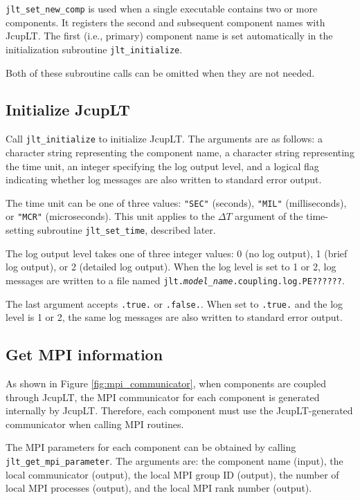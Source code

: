 \documentclass[11pt,a4paper]{report}
\newcommand{\figref}[1]{Figure \ref{#1}}
\begin{document}
\texttt{jlt\_set\_new\_comp} is used
when a single executable contains two or more components.
It registers the second and subsequent component names with JcupLT.
The first (i.e., primary) component name
is set automatically in the initialization subroutine
\texttt{jlt\_initialize}.

Both of these subroutine calls can be omitted
when they are not needed.

\subsection{Initialize JcupLT}

Call \texttt{jlt\_initialize} to initialize JcupLT.
The arguments are as follows:
a character string representing the component name,
a character string representing the time unit,
an integer specifying the log output level,
and a logical flag indicating whether log messages
are also written to standard error output.

The time unit can be one of three values:
\texttt{"SEC"} (seconds),
\texttt{"MIL"} (milliseconds),
or \texttt{"MCR"} (microseconds).
This unit applies to the $\Delta T$ argument
of the time-setting subroutine \texttt{jlt\_set\_time},
described later.

The log output level takes one of three integer values:
0 (no log output),
1 (brief log output),
or 2 (detailed log output).
When the log level is set to 1 or 2,
log messages are written to a file named
\texttt{jlt.\textit{model\_name}.coupling.log.PE??????}.

The last argument accepts \texttt{.true.} or \texttt{.false.}.
When set to \texttt{.true.}
and the log level is 1 or 2,
the same log messages are also written
to standard error output.

\subsection{Get MPI information}

As shown in \figref{fig:mpi_communicator},
when components are coupled through JcupLT,
the MPI communicator for each component
is generated internally by JcupLT.
Therefore, each component must use
the JcupLT-generated communicator
when calling MPI routines.

The MPI parameters for each component
can be obtained by calling \texttt{jlt\_get\_mpi\_parameter}.
The arguments are:
the component name (input),
the local communicator (output),
the local MPI group ID (output),
the number of local MPI processes (output),
and the local MPI rank number (output).
\end{document}
